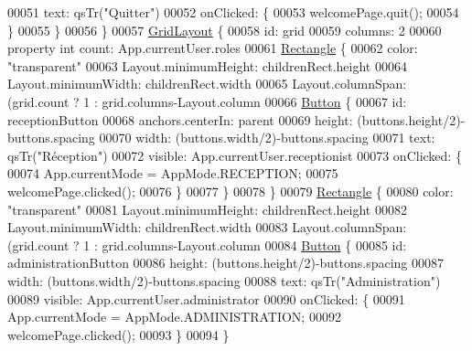 \begin{DoxyCode}
00051                 text: qsTr(\textcolor{stringliteral}{"Quitter"})
00052                 onClicked: \{
00053                     welcomePage.quit();
00054                 \}
00055             \}
00056         \}
00057         \hyperlink{classGridLayout}{GridLayout} \{
00058             \textcolor{keywordtype}{id}: grid
00059             columns: 2
00060             \textcolor{keyword}{property} \textcolor{keywordtype}{int} count: App.currentUser.roles
00061             \hyperlink{classRectangle}{Rectangle} \{
00062                 color: \textcolor{stringliteral}{"transparent"}
00063                 Layout.minimumHeight: childrenRect.height
00064                 Layout.minimumWidth: childrenRect.width
00065                 Layout.columnSpan: (grid.count%
      ? 1 : grid.columns-Layout.column
00066                 \hyperlink{classButton}{Button} \{
00067                     \textcolor{keywordtype}{id}: receptionButton
00068                     anchors.centerIn: parent
00069                     height: (buttons.height/2)-buttons.spacing
00070                     width: (buttons.width/2)-buttons.spacing
00071                     text: qsTr(\textcolor{stringliteral}{"Réception"})
00072                     visible: App.currentUser.receptionist
00073                     onClicked: \{
00074                         App.currentMode = AppMode.RECEPTION;
00075                         welcomePage.clicked();
00076                     \}
00077                 \}
00078             \}
00079             \hyperlink{classRectangle}{Rectangle} \{
00080                 color: \textcolor{stringliteral}{"transparent"}
00081                 Layout.minimumHeight: childrenRect.height
00082                 Layout.minimumWidth: childrenRect.width
00083                 Layout.columnSpan: (grid.count%
      ? 1 : grid.columns-Layout.column
00084                 \hyperlink{classButton}{Button} \{
00085                     \textcolor{keywordtype}{id}: administrationButton
00086                     height: (buttons.height/2)-buttons.spacing
00087                     width: (buttons.width/2)-buttons.spacing
00088                     text: qsTr(\textcolor{stringliteral}{"Administration"})
00089                     visible: App.currentUser.administrator
00090                     onClicked: \{
00091                         App.currentMode = AppMode.ADMINISTRATION;
00092                         welcomePage.clicked();
00093                     \}
00094                 \}

\end{DoxyCode}
